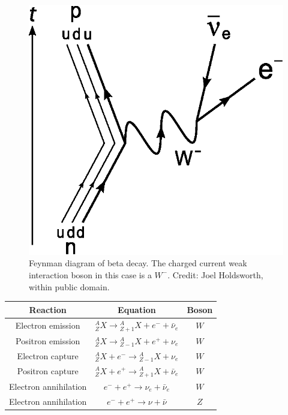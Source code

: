 \documentclass{sciposter}
\begin{document}
\begin{multicols}{3}
\begin{figure}[h]
\centering
\includegraphics[width=\columnwidth]{assets/Beta_Negative_Decay.eps}
\caption{Feynman diagram of beta decay. The charged current weak interaction boson in this case is a $W^-$. Credit: Joel Holdsworth, within public domain.}
\label{fig:Beta_Negative_Decay}
\end{figure}





\begin{table}[ht]
\centering
 \begin{tabular}{|c | c | c|} 
 \hline
 Reaction & Equation & Boson   \\ [0.5ex] 
 \hline
 Electron emission & ${}^A_Z X \to {}^A_{Z+1}X + e^- +\bar \nu_e$ & $W$  \\ 
 Positron emission & ${}^A_Z X \to {}^A_{Z-1}X + e^+ + \nu_e$ & $W$  \\
 Electron capture & ${}^A_Z X + e^- \to {}^A_{Z-1}X  + \nu_e$ &  $W$ \\
 Positron capture & ${}^A_Z X + e^+ \to {}^A_{Z+1}X  + \bar\nu_e$ &  $W$ \\
 [0.5ex] 
 \hline

 Electron annihilation &  $e^- + e^+  \to \nu_e + \bar\nu_e $  & $W$ \\
 Electron annihilation &  $e^- + e^+  \to \nu + \bar\nu $  & $Z$ \\
 [0.5ex] 
 \hline


\end{tabular}
\end{table}
\end{multicols}
\end{document}
